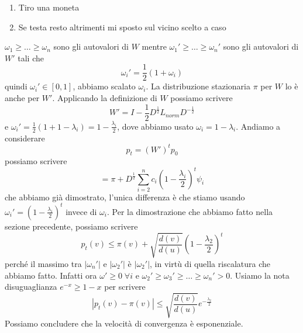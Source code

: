 \documentclass[12pt]{report}
\begin{document}
\begin{enumerate}
    \item Tiro una moneta
    \item Se testa resto altrimenti mi sposto sul vicino scelto a caso
\end{enumerate}
$\omega_1\geq \dots\geq \omega_n$ sono gli autovalori di $W$ mentre $\omega_1'\geq \dots\geq \omega_n'$  sono gli autovalori di $W'$ tali che 
$$\omega_i' = \frac{1}{2}(1 + \omega_i)$$
quindi $\omega_i' \in [0,1]$, abbiamo scalato $\omega_i$. La distribuzione stazionaria $\pi$ per $W$ lo è anche per $W'$. Applicando la definizione di $W$ possiamo scrivere
$$W' = I - \frac{1}{2}D^\frac{1}{2} L_{norm} D^{-\frac{1}{2}}$$
e $\omega_i' = \frac{1}{2}(1 + 1 -\lambda_i) = 1 - \frac{\lambda_i}{2}$, dove abbiamo usato $\omega_i = 1 - \lambda_i$.
Andiamo a considerare
$$p_t = (W')^t p_0$$
possiamo scrivere
$$= \pi + D^\frac{1}{2} \sum_{i=2}^n c_i (1 -\frac{\lambda_i}{2})^t \psi_i$$
che abbiamo già dimostrato, l'unica differenza è che stiamo usando $\omega_i' = (1 -\frac{\lambda_i}{2})^t$ invece di $\omega_i$. Per la dimostrazione che abbiamo fatto nella sezione precedente, possiamo scrivere 
$$p_t(v) \leq \pi(v) + \sqrt{\frac{d(v)}{d(u)}}(1 - \frac{\lambda_2}{2})^t$$
perché il massimo tra $|\omega_n'|$ e $|\omega_2'|$ è  $|\omega_2'|$, in virtù di quella riscalatura che abbiamo fatto. Infatti ora $\omega' \geq 0 \; \forall i$ e $\omega_2' \geq \omega_3' \geq \dots \geq \omega_n' > 0$. Usiamo la nota disuguaglianza $e^{-x} \geq 1-x$ per scrivere
$$|p_t(v) - \pi(v) | \leq \sqrt{\frac{d(v)}{d(u)}} e^{-\frac{\lambda_2}{2}}$$
Possiamo concludere che la velocità di convergenza è esponenziale.
\end{document}
